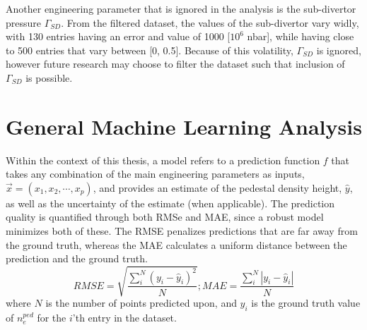 \documentclass[a4paper, twoside, final, 12pt]{article}
\begin{document}
Another engineering parameter that is ignored in the analysis is the sub-divertor pressure $\Gamma_{SD}$.
From the filtered dataset, the values of the sub-divertor vary widly, with 130 entries having an error and value of 1000 [$10^6$ nbar], while having close to 500 entries that vary between [0, 0.5].
Because of this volatility, $\Gamma_{SD}$ is ignored, however future research may choose to filter the dataset such that inclusion of $\Gamma_{SD}$ is possible.



\section{General Machine Learning Analysis}\label{sec:principle-machine-learning-analysis}
Within the context of this thesis, a model refers to a prediction function $f$ that takes any combination of the main engineering parameters as inputs, $\vec{x} = (x_1, x_2, \cdots, x_p)$,  and provides an estimate of the pedestal density height, $\hat{y}$, as well as the uncertainty of the estimate (when applicable).
The prediction quality is quantified through both RMSe and MAE, since a robust model minimizes both of these.
The RMSE penalizes predictions that are far away from the ground truth, whereas the MAE calculates a uniform distance between the prediction and the ground truth.
\[RMSE = \sqrt{\frac{\sum_i^N \left( y_i - \hat{y}_i \right)^2}{N}}; MAE = \frac{\sum_i^N |y_i -  \hat{y}_i |}{N}  \] 
where $N$ is the number of points predicted upon, and $y_i$ is the ground truth value of $n_e^{ped}$ for the $i$'th entry in the dataset. 
\end{document}
